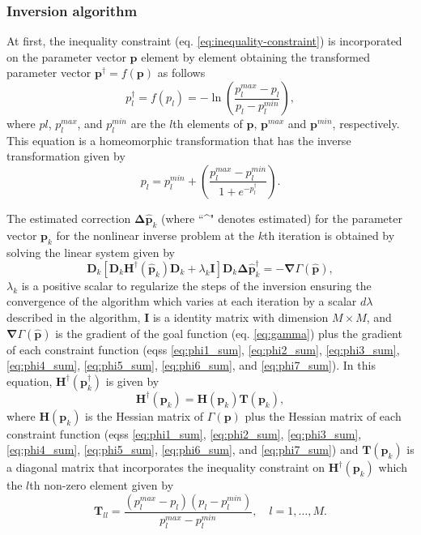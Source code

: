 \subsubsection{Inversion algorithm}

At first, the inequality constraint (eq. \ref{eq:inequality-constraint}) is incorporated on the parameter vector $\mathbf{p}$ element by element obtaining the transformed parameter vector $\mathbf{p}^\dagger = f(\mathbf{p})$ as follows
\begin{equation}\label{eq:inequality-function}
p^\dagger_l = f(p_l) = -\ln\left(\frac{p_l^{max} - p_l}{p_l - p_l^{min}}\right),
\end{equation}
where $pl$, $p_l^{max}$, and $p_l^{min}$ are the $l$th elements of $\mathbf{p}$, $\mathbf{p}^{max}$ and $\mathbf{p}^{min}$, respectively. This equation is a homeomorphic transformation that has the inverse transformation given by
\begin{equation}\label{eq:inv-inequality-function}
p_l = p_l^{min} + \left(\frac{p_l^{max} - p_l^{min}}{ 1 + e^{-p^\dagger_l} }\right).
\end{equation}

The estimated correction $\boldsymbol{\Delta}\hat{\mathbf{p}}_k$ (where ``\^{}" denotes estimated) for the parameter vector $\mathbf{p}_k$ for the nonlinear inverse problem at the $k$th iteration is obtained by solving the linear system given by
\begin{equation}\label{eq:linear-system}
\mathbf{D}_k\left[\mathbf{D}_k\mathbf{H}^\dagger(\hat{\mathbf{p}}_k)\mathbf{D}_k + \lambda_k\mathbf{I}\right]\mathbf{D}_k\boldsymbol{\Delta}\hat{\mathbf{p}}^\dagger_k = -\boldsymbol{\nabla}\Gamma(\hat{\mathbf{p}}),
\end{equation}
$\lambda_k$ is a positive scalar to regularize the steps of the inversion ensuring the convergence of the algorithm which varies at each iteration by a scalar $d\lambda$ described in the algorithm, $\mathbf{I}$ is a identity matrix with dimension $M\times M$, and $\boldsymbol{\nabla}\Gamma(\hat{\mathbf{p}})$ is the gradient of the goal function (eq. \ref{eq:gamma}) plus the gradient of each constraint function (eqss \ref{eq:phi1_sum}, \ref{eq:phi2_sum}, \ref{eq:phi3_sum}, \ref{eq:phi4_sum}, \ref{eq:phi5_sum}, \ref{eq:phi6_sum}, and \ref{eq:phi7_sum}). In this equation, $\mathbf{H}^\dagger(\mathbf{p}^\dagger_k)$ is given by
\begin{equation}\label{eq:H-dagger}
\mathbf{H}^\dagger(\mathbf{p}_k) = \mathbf{H}(\mathbf{p}_k)\mathbf{T}(\mathbf{p}_k),
\end{equation}
where $\mathbf{H}(\mathbf{p}_k)$ is the Hessian matrix of $\Gamma(\mathbf{p})$ plus the Hessian matrix of each constraint function (eqss \ref{eq:phi1_sum}, \ref{eq:phi2_sum}, \ref{eq:phi3_sum}, \ref{eq:phi4_sum}, \ref{eq:phi5_sum}, \ref{eq:phi6_sum}, and \ref{eq:phi7_sum}) and $\mathbf{T}(\mathbf{p}_k)$ is a diagonal matrix that incorporates the inequality constraint on $\mathbf{H}^\dagger(\mathbf{p}_k)$ which the $l$th non-zero element given by
\begin{equation}\label{eq:inequality-diag}
\mathbf{T}_{ll} = \frac{(p_l^{max} - p_l)(p_l - p_l^{min})}{p_l^{max} - p_l^{min}}, \quad l = 1, \dots, M .
\end{equation}

